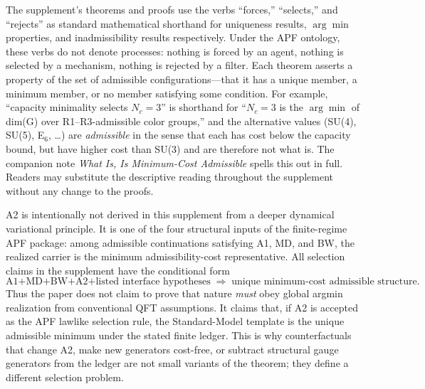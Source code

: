 \documentclass[11pt]{article}
\theoremstyle{definition}
\begin{document}
\begin{tcolorbox}[apfbox, title={Framing convention: ``forces'' and ``selects'' denote uniqueness, not processes}]
\footnotesize
The supplement's theorems and proofs use the verbs ``forces,'' ``selects,'' and ``rejects'' as standard mathematical shorthand for uniqueness results, $\arg\min$ properties, and inadmissibility results respectively.  Under the APF ontology, these verbs do not denote processes: nothing is forced by an agent, nothing is selected by a mechanism, nothing is rejected by a filter.  Each theorem asserts a property of the set of admissible configurations---that it has a unique member, a minimum member, or no member satisfying some condition.  For example, ``capacity minimality selects $N_c = 3$'' is shorthand for ``$N_c = 3$ is the $\arg\min$ of dim(G) over R1--R3-admissible color groups,'' and the alternative values (SU(4), SU(5), E$_6$, \ldots) are \emph{admissible} in the sense that each has cost below the capacity bound, but have higher cost than SU(3) and are therefore not what is.  The companion note \emph{What Is, Is Minimum-Cost Admissible} spells this out in full.  Readers may substitute the descriptive reading throughout the supplement without any change to the proofs.

\begin{tcolorbox}[apfbox, title={Status of A2: argmin realization is a lawlike selection rule, not a derived dynamics}]
\footnotesize
A2 is intentionally not derived in this supplement from a deeper dynamical variational principle.  It is one of the four structural inputs of the finite-regime APF package: among admissible continuations satisfying A1, MD, and BW, the realized carrier is the minimum admissibility-cost representative.  All selection claims in the supplement have the conditional form
\[
  \text{A1+MD+BW+A2+listed interface hypotheses} \;\Longrightarrow\; \text{unique minimum-cost admissible structure}.
\]
Thus the paper does not claim to prove that nature \emph{must} obey global argmin realization from conventional QFT assumptions.  It claims that, if A2 is accepted as the APF lawlike selection rule, the Standard-Model template is the unique admissible minimum under the stated finite ledger.  This is why counterfactuals that change A2, make new generators cost-free, or subtract structural gauge generators from the ledger are not small variants of the theorem; they define a different selection problem.
\end{tcolorbox}
\end{tcolorbox}
\end{document}
